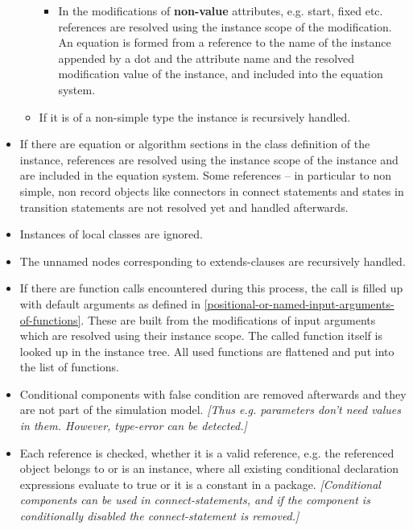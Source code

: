 \documentclass[10pt,a4paper]{report}
\begin{document}
\begin{itemize}
\begin{itemize}
    \begin{itemize}
    \item
      In the modifications of \textbf{non-value} attributes, e.g. start,
      fixed etc. references are resolved using the instance scope of the
      modification. An equation is formed from a reference to the name
      of the instance appended by a dot and the attribute name and the
      resolved modification value of the instance, and included into the
      equation system.
    \end{itemize}
  \item
    If it is of a non-simple type the instance is recursively handled.
  \end{itemize}
\item
  If there are equation or algorithm sections in the class definition of
  the instance, references are resolved using the instance scope of the
  instance and are included in the equation system. Some references --
  in particular to non simple, non record objects like connectors in
  connect statements and states in transition statements are not
  resolved yet and handled afterwards.
\item
  Instances of local classes are ignored.
\item
  The unnamed nodes corresponding to extends-clauses are recursively
  handled.
\item
  If there are function calls encountered during this process, the call
  is filled up with default arguments as defined in \ref{positional-or-named-input-arguments-of-functions}. These are
  built from the modifications of input arguments which are resolved
  using their instance scope. The called function itself is looked up in
  the instance tree. All used functions are flattened and put into the
  list of functions.
\item
  Conditional components with false condition are removed afterwards and
  they are not part of the simulation model. \emph{{[}Thus e.g.
  parameters don't need values in them. However, type-error can be
  detected.{]}}
\item
  Each reference is checked, whether it is a valid reference, e.g. the
  referenced object belongs to or is an instance, where all existing
  conditional declaration expressions evaluate to true or it is a
  constant in a package. \emph{{[}Conditional components can be used in
  connect-statements, and if the component is conditionally disabled the
  connect-statement is removed.{]}}
\end{itemize}
\end{document}
